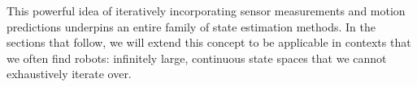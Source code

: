This powerful idea of iteratively incorporating sensor measurements and motion predictions underpins an entire family of state estimation methods. In the sections that follow, we will extend this concept to be applicable in contexts that we often find robots: infinitely large, continuous state spaces that we cannot exhaustively iterate over.



